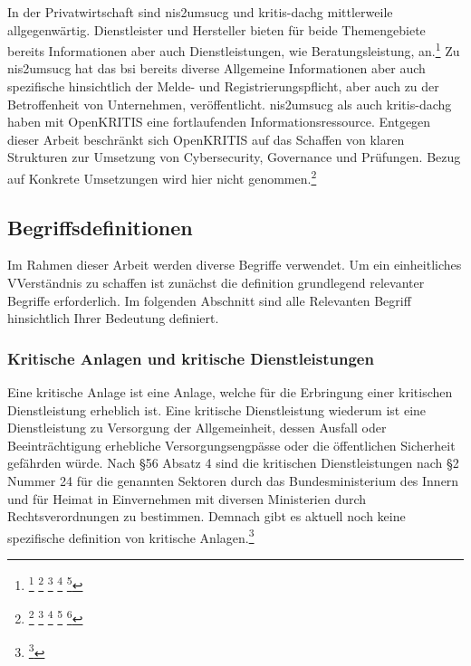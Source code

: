 \documentclass[11pt,a4paper,hidelinks]{article}   %
\begin{document}
        In der Privatwirtschaft sind \gls{nis2umsucg} und \gls{kritis-dachg} mittlerweile allgegenwärtig. Dienstleister und Hersteller bieten für beide Themengebiete bereits Informationen aber auch Dienstleistungen, wie Beratungsleistung, an.\footnote{
            \footcite[Vgl.][]{openkritis:217173}
            \footcite[Vgl.][]{bechtle:8d80e0}
            \footcite[Vgl.][]{ithaus:a13909}
            \footcite[Vgl.][]{schmidalarm:39d493}
            \footcite[Vgl.][]{telenot:5f5056}
        } Zu \gls{nis2umsucg} hat das \gls{bsi} bereits diverse Allgemeine Informationen aber auch spezifische hinsichtlich der Melde- und Registrierungspflicht, aber auch zu der Betroffenheit von Unternehmen, veröffentlicht. \gls{nis2umsucg} als auch \gls{kritis-dachg} haben mit OpenKRITIS eine fortlaufenden Informationsressource. Entgegen dieser Arbeit beschränkt sich OpenKRITIS auf das Schaffen von klaren Strukturen zur Umsetzung von Cybersecurity, Governance und Prüfungen. Bezug auf Konkrete Umsetzungen wird hier nicht genommen.\footnote{
            \footcite[Vgl.][]{bsi:544680}
            \footcite[Vgl.][]{bsi:0d23a2}
            \footcite[Vgl.][]{bsi:ad8980}
            \footcite[Vgl.][]{bsi:61aa17}
            \footcite[Vgl.][]{bmi:521cab}
        }
        
        \subsection{Begriffsdefinitionen}                                               
        Im Rahmen dieser Arbeit werden diverse Begriffe verwendet. Um ein einheitliches VVerständnis zu schaffen ist zunächst die definition grundlegend relevanter Begriffe erforderlich. Im folgenden Abschnitt sind alle Relevanten Begriff hinsichtlich Ihrer Bedeutung definiert.
            \subsubsection{Kritische Anlagen und kritische Dienstleistungen}
            Eine kritische Anlage ist eine Anlage, welche für die Erbringung einer kritischen Dienstleistung erheblich ist. Eine kritische Dienstleistung wiederum ist eine Dienstleistung zu Versorgung der Allgemeinheit, dessen Ausfall oder Beeinträchtigung erhebliche Versorgungsengpässe oder die öffentlichen Sicherheit gefährden würde. Nach §56 Absatz 4 sind die kritischen Dienstleistungen nach §2 Nummer 24 für die genannten Sektoren durch das Bundesministerium des Innern und für Heimat in Einvernehmen mit diversen Ministerien durch Rechtsverordnungen zu bestimmen. Demnach gibt es aktuell noch keine spezifische definition von kritische Anlagen.\footnote{
                \footcite[Vgl.][, §2 Nummer 22, 24 \& §56 Absatz 4]{NIS2UmsuCG}
            }
\end{document}
